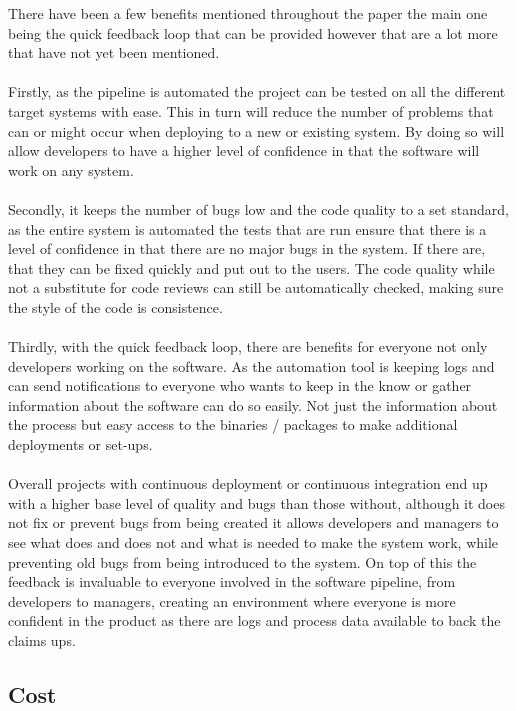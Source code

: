 There have been a few benefits mentioned throughout the paper the main one being the quick feedback loop that can be provided however that are a lot more that have not yet been mentioned.
\\\\
Firstly, as the pipeline is automated the project can be tested on all the different target systems with ease. This in turn will reduce the number of problems that can or might occur when deploying to a new or existing system. By doing so will allow developers to have a higher level of confidence in that the software will work on any system.
\\\\
Secondly, it keeps the number of bugs low and the code quality to a set standard,  as the entire system is automated the tests that are run ensure that there is a level of confidence in that there are no major bugs in the system. If there are, that they can be fixed quickly and put out to the users. The code quality while not a substitute for code reviews can still be automatically checked, making sure the style of the code is consistence. 
\\\\
Thirdly, with the quick feedback loop, there are benefits for everyone not only developers working on the software. As the automation tool is keeping logs and can send notifications to everyone who wants to keep in the know or gather information about the software can do so easily. Not just the information about the process but easy access to the binaries / packages to make additional deployments or set-ups.
\\\\
Overall projects with continuous deployment or continuous integration end up with a higher base level of quality and bugs than those without, although it does not fix or prevent bugs from being created it allows developers and managers to see what does and does not and what is needed to make the system work, while preventing old bugs from being introduced to the system. On top of this the feedback is invaluable to everyone involved in the software pipeline, from developers to managers, creating an environment where everyone is more confident in the product as there are logs and process data available to back the claims ups.


\subsection{Cost}

